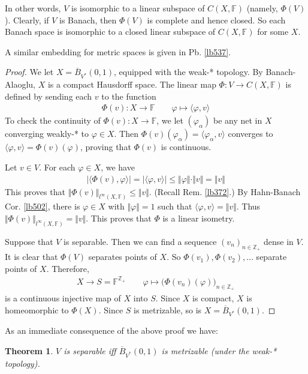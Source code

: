 \documentclass[12pt,b5paper,notitlepage]{article}
\theoremstyle{definition}
\theoremstyle{plain}
\newtheorem{thm}[df]{Theorem}
\newcommand{\ovl}{\overline}
\newcommand{\bk}[1]{\langle {#1}\rangle}
\newcommand{\Zbb}{\mathbb Z}
\newcommand{\Fbb}{\mathbb F}
\numberwithin{equation}{section}
\begin{document}
In other words, $V$ is isomorphic to a linear subspace of $C(X,\Fbb)$ (namely, $\Phi(V)$). Clearly, if $V$ is Banach, then $\Phi(V)$ is complete and hence closed. So each Banach space is isomorphic to a closed linear subspace of $C(X,\Fbb)$ for some $X$.

A similar embedding for metric spaces is given in Pb. \ref{lb537}.

\begin{proof}
We let $X=\ovl B_{V^*}(0,1)$, equipped with the weak-* topology. By Banach-Alaoglu, $X$ is a compact Hausdorff space. The linear map $\Phi:V\rightarrow C(X,\Fbb)$ is defined by sending each $v$ to the function
\begin{align*}
\Phi(v):X\rightarrow \Fbb\qquad\varphi\mapsto \bk{\varphi,v}
\end{align*}
To check the continuity of $\Phi(v):X\rightarrow\Fbb$, we let $(\varphi_\alpha)$ be any net in $X$ converging weakly-* to $\varphi\in X$. Then $\Phi(v)(\varphi_\alpha)=\bk{\varphi_\alpha,v}$ converges to $\bk{\varphi,v}=\Phi(v)(\varphi)$, proving that $\Phi(v)$ is continuous.

Let $v\in V$. For each $\varphi\in X$, we have
\begin{align*}
|\bk{\Phi(v),\varphi}|=|\bk{\varphi,v}|\leq\Vert\varphi\Vert\cdot\Vert v\Vert=\Vert v\Vert
\end{align*}
This proves that $\Vert \Phi(v)\Vert_{l^\infty(X,\Fbb)}\leq \Vert v\Vert$. (Recall Rem. \ref{lb372}.) By Hahn-Banach Cor. \ref{lb502}, there is $\varphi\in X$ with $\Vert\varphi\Vert=1$ such that $\bk{\varphi,v}=\Vert v\Vert$. Thus $\Vert \Phi(v)\Vert_{l^\infty(X,\Fbb)}=\Vert v\Vert$. This proves that $\Phi$ is a linear isometry.

Suppose that $V$ is separable. Then we can find a sequence $(v_n)_{n\in\Zbb_+}$ dense in $V$.  It is clear that $\Phi(V)$ separates points of $X$. So $\Phi(v_1),\Phi(v_2),\dots$ separate points of $X$.
Therefore,
\begin{align}
X\rightarrow S=\Fbb^{\Zbb_+}\qquad \varphi\mapsto \big(\Phi(v_n)(\varphi)\big)_{n\in\Zbb_+}
\end{align} 
is a continuous injective map of $X$ into $S$. Since $X$ is compact, $X$ is homeomorphic to $\Phi(X)$. Since $S$ is metrizable, so is $X=\ovl B_{V^*}(0,1)$.
\end{proof}


As an immediate consequence of the above proof we have:

\begin{thm}\label{lb523}
$V$ is separable iff $\ovl B_{V^*}(0,1)$ is metrizable (under the weak-* topology).
\end{thm}
\end{document}
